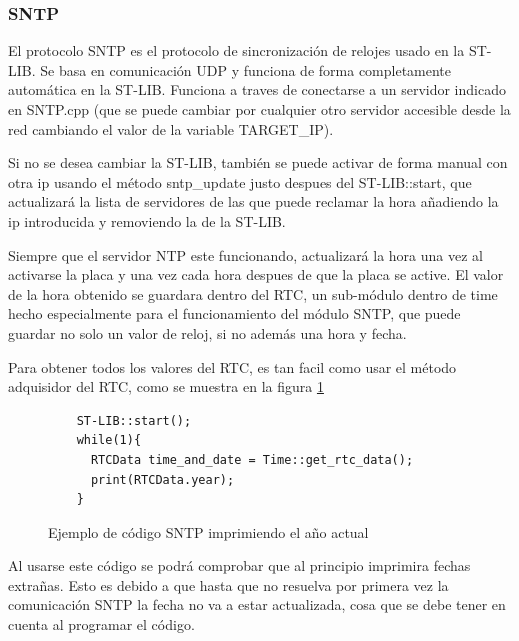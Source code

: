 \documentclass{report}
\begin{document}
\subsubsection{SNTP}
El protocolo SNTP es el protocolo de sincronización de relojes usado en la ST-LIB. Se basa en comunicación UDP y funciona de forma completamente automática en la ST-LIB. Funciona a traves de conectarse a un servidor indicado en SNTP.cpp (que se puede cambiar por cualquier otro servidor accesible desde la red cambiando el valor de la variable TARGET\_IP). \par 
Si no se desea cambiar la ST-LIB, también se puede activar de forma manual con otra ip usando el método sntp\_update justo despues del ST-LIB::start, que actualizará la lista de servidores de las que puede reclamar la hora añadiendo la ip introducida y removiendo la de la ST-LIB. 
\par \vspace{0.3cm}
Siempre que el servidor NTP este funcionando, actualizará la hora una vez al activarse la placa y una vez cada hora despues de que la placa se active. El valor de la hora obtenido se guardara dentro del RTC, un sub-módulo dentro de time hecho especialmente para el funcionamiento del módulo SNTP, que puede guardar no solo un valor de reloj, si no además una hora y fecha. 
\par \vspace{0.3cm}
Para obtener todos los valores del RTC, es tan facil como usar el método adquisidor del RTC, como se muestra en la figura \ref{SNTPCode}

\begin{figure}[H]
  \begin{lstlisting}
    ST-LIB::start();
    while(1){
      RTCData time_and_date = Time::get_rtc_data();
      print(RTCData.year);
    }
  \end{lstlisting}
  \caption{Ejemplo de código SNTP imprimiendo el año actual}
  \label{SNTPCode}
\end{figure}
\par \vspace{0.3cm}
Al usarse este código se podrá comprobar que al principio imprimira fechas extrañas. Esto es debido a que hasta que no resuelva por primera vez la comunicación SNTP la fecha no va a estar actualizada, cosa que se debe tener en cuenta al programar el código. 

\newpage
\end{document}
